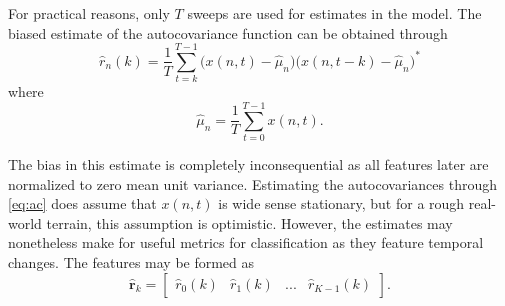 





For practical reasons, only $T$ sweeps are used for estimates in the model. The biased estimate of the autocovariance function can be obtained through \citep{jakobsson_2015}
\begin{equation}
\label{eq:ac}
	\hat{r}_n(k) = \frac{1}{T}\sum_{t=k}^{T-1}\big(x(n,t) - \hat{\mu}_n\big)\big(x(n,t-k) - \hat{\mu}_n\big)^*
\end{equation}
where 
\begin{equation}
	\hat{\mu}_n = \frac1T \sum_{t=0}^{T-1}x(n,t).
\end{equation}

The bias in this estimate is completely inconsequential as all features later are normalized to zero mean unit variance. Estimating the autocovariances through \eqref{eq:ac} does assume that $x(n,t)$ is wide sense stationary, but for a rough real-world terrain, this assumption is optimistic. However, the estimates may nonetheless make for useful metrics for classification as they feature temporal changes. The features may be formed as
\begin{equation}
	\hat{\mathbf{r}}_{k} = 
	\begin{bmatrix}
		\hat{r}_0(k) & \hat{r}_1(k) & ... & \hat{r}_{K-1}(k)
	\end{bmatrix}.
\end{equation}

